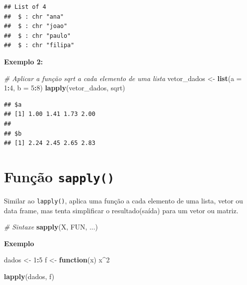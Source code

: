 \documentclass[
]{book}
\newenvironment{Shaded}{\begin{snugshade}}{\end{snugshade}}
\newcommand{\AttributeTok}[1]{\textcolor[rgb]{0.13,0.29,0.53}{#1}}
\newcommand{\CommentTok}[1]{\textcolor[rgb]{0.56,0.35,0.01}{\textit{#1}}}
\newcommand{\ControlFlowTok}[1]{\textcolor[rgb]{0.13,0.29,0.53}{\textbf{#1}}}
\newcommand{\DecValTok}[1]{\textcolor[rgb]{0.00,0.00,0.81}{#1}}
\newcommand{\FunctionTok}[1]{\textcolor[rgb]{0.13,0.29,0.53}{\textbf{#1}}}
\newcommand{\NormalTok}[1]{#1}
\newcommand{\OtherTok}[1]{\textcolor[rgb]{0.56,0.35,0.01}{#1}}
\newcommand{\SpecialCharTok}[1]{\textcolor[rgb]{0.81,0.36,0.00}{\textbf{#1}}}
\begin{document}
\begin{verbatim}
## List of 4
##  $ : chr "ana"
##  $ : chr "joao"
##  $ : chr "paulo"
##  $ : chr "filipa"
\end{verbatim}

\textbf{Exemplo 2:}

\begin{Shaded}
\begin{Highlighting}[]
\CommentTok{\# Aplicar a função sqrt a cada elemento de uma lista}
\NormalTok{vetor\_dados }\OtherTok{\textless{}{-}} \FunctionTok{list}\NormalTok{(}\AttributeTok{a =} \DecValTok{1}\SpecialCharTok{:}\DecValTok{4}\NormalTok{, }\AttributeTok{b =} \DecValTok{5}\SpecialCharTok{:}\DecValTok{8}\NormalTok{)}
\FunctionTok{lapply}\NormalTok{(vetor\_dados, sqrt)}
\end{Highlighting}
\end{Shaded}

\begin{verbatim}
## $a
## [1] 1.00 1.41 1.73 2.00
## 
## $b
## [1] 2.24 2.45 2.65 2.83
\end{verbatim}

\section{\texorpdfstring{Função \texttt{sapply()}}{Função sapply()}}\label{funuxe7uxe3o-sapply}

Similar ao \texttt{lapply()}, aplica uma função a cada elemento de uma lista, vetor ou data frame, mas tenta simplificar o resultado(saída) para um vetor ou matriz.

\begin{Shaded}
\begin{Highlighting}[]
\CommentTok{\# Sintaxe}
\FunctionTok{sapply}\NormalTok{(X, FUN, ...)}
\end{Highlighting}
\end{Shaded}

\textbf{Exemplo}

\begin{Shaded}
\begin{Highlighting}[]
\NormalTok{dados }\OtherTok{\textless{}{-}} \DecValTok{1}\SpecialCharTok{:}\DecValTok{5}
\NormalTok{f }\OtherTok{\textless{}{-}} \ControlFlowTok{function}\NormalTok{(x) x}\SpecialCharTok{\^{}}\DecValTok{2}

\FunctionTok{lapply}\NormalTok{(dados, f)}
\end{Highlighting}
\end{Shaded}
\end{document}

